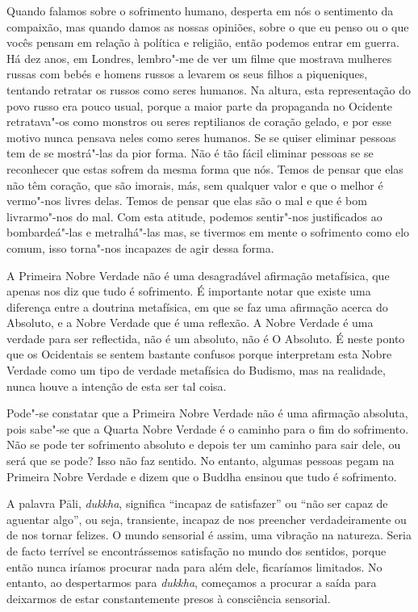 Quando falamos sobre o sofrimento humano, desperta em nós o sentimento da
compaixão, mas quando damos as nossas opiniões, sobre o que eu penso ou o que
vocês pensam em relação à política e religião, então podemos entrar em guerra.
Há dez anos, em Londres, lembro"-me de ver um filme que mostrava mulheres russas
com bebés e homens russos a levarem os seus filhos a piqueniques, tentando
retratar os russos como seres humanos. Na altura, esta representação do povo
russo era pouco usual, porque a maior parte da propaganda no Ocidente
retratava"-os como monstros ou seres reptilianos de coração gelado, e por esse
motivo nunca pensava neles como seres humanos. Se se quiser eliminar pessoas tem
de se mostrá"-las da pior forma. Não é tão fácil eliminar pessoas se se reconhecer que
estas sofrem da mesma forma que nós. Temos de pensar que elas não têm coração,
que são imorais, más, sem qualquer valor e que o melhor é vermo"-nos livres
delas. Temos de pensar que elas são o mal e que é bom livrarmo"-nos do mal. Com
esta atitude, podemos sentir"-nos justificados ao bombardeá"-las e metralhá"-las
mas, se tivermos em mente o sofrimento como elo comum, isso torna"-nos incapazes
de agir dessa forma.

A Primeira Nobre Verdade não é uma desagradável afirmação metafísica, que apenas
nos diz que tudo é sofrimento. É importante notar que existe uma diferença entre
a doutrina metafísica, em que se faz uma afirmação acerca do Absoluto, e a Nobre
Verdade que é uma reflexão. A Nobre Verdade é uma verdade para ser reflectida,
não é um absoluto, não é O Absoluto. É neste ponto que os Ocidentais se sentem
bastante confusos porque interpretam esta Nobre Verdade como um tipo de verdade
metafísica do Budismo, mas na realidade, nunca houve a intenção de esta ser tal
coisa.

Pode"-se constatar que a Primeira Nobre Verdade não é uma afirmação absoluta,
pois sabe"-se que a Quarta Nobre Verdade é o caminho para o fim do sofrimento.
Não se pode ter sofrimento absoluto e depois ter um caminho para sair dele, ou
será que se pode? Isso não faz sentido. No entanto, algumas pessoas pegam na
Primeira Nobre Verdade e dizem que o Buddha ensinou que tudo é sofrimento.

A palavra Pāli, \emph{dukkha}, significa “incapaz de satisfazer” ou “não ser
capaz de aguentar algo”, ou seja, transiente, incapaz de nos preencher
verdadeiramente ou de nos tornar felizes. O mundo sensorial é assim, uma
vibração na natureza. Seria de facto terrível se encontrássemos satisfação no
mundo dos sentidos, porque então nunca iríamos procurar nada para além dele, ficaríamos
limitados. No entanto, ao despertarmos para \emph{dukkha}, começamos a procurar
a saída para deixarmos de estar constantemente presos à consciência sensorial.

